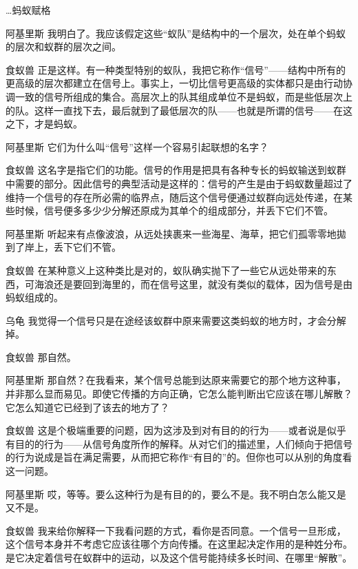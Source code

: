 \begin{dialog}{…蚂蚁赋格}
\begin{dialogue}
\item[阿基里斯]我明白了。我应该假定这些“蚁队”是结构中的一个层次，处在单个蚂蚁的层次和蚁群的层次之间。

\item[食蚁兽]正是这样。有一种类型特别的蚁队，我把它称作“信号”——结构中所有的更高级的层次都建立在信号上。事实上，一切比信号更高级的实体都只是由行动协调一致的信号所组成的集合。高层次上的队其组成单位不是蚂蚁，而是些低层次上的队。这样一直找下去，最后就到了最低层次的队——也就是所谓的信号——在这之下，才是蚂蚁。

\item[阿基里斯]它们为什么叫“信号”这样一个容易引起联想的名字？

\item[食蚁兽]这名字是指它们的功能。信号的作用是把具有各种专长的蚂蚁输送到蚁群中需要的部分。因此信号的典型活动是这样的：信号的产生是由于蚂蚁数量超过了维持一个信号的存在所必需的临界点，随后这个信号便通过蚁群向远处传递，在某些时候，信号便多多少少分解还原成为其单个的组成部分，并丢下它们不管。

\item[阿基里斯]听起来有点像波浪，从远处挟裹来一些海星、海草，把它们孤零零地拋到了岸上，丢下它们不管。

\item[食蚁兽]在某种意义上这种类比是对的，蚁队确实抛下了一些它从远处带来的东西，可海浪还是要回到海里的，而在信号这里，就没有类似的载体，因为信号是由蚂蚁组成的。

\item[乌龟]我觉得一个信号只是在途经该蚁群中原来需要这类蚂蚁的地方时，才会分解掉。

\item[食蚁兽]那自然。

\item[阿基里斯]那自然？在我看来，某个信号总能到达原来需要它的那个地方这种事，并非那么显而易见。即使它传播的方向正确，它怎么能判断出它应该在哪儿解散？它怎么知道它已经到了该去的地方了？

\item[食蚁兽]这是个极端重要的问题，因为这涉及到对有目的的行为——或者说是似乎有目的的行为——从信号角度所作的解释。从对它们的描述里，人们倾向于把信号的行为说成是旨在满足需要，从而把它称作“有目的”的。但你也可以从别的角度看这一问题。

\item[阿基里斯]哎，等等。要么这种行为是有目的的，要么不是。我不明白怎么能又是又不是。

\item[食蚁兽]我来给你解释一下我看问题的方式，看你是否同意。一个信号一旦形成，这个信号本身并不考虑它应该往哪个方向传播。在这里起决定作用的是种姓分布。是它决定着信号在蚁群中的运动，以及这个信号能持续多长时间、在哪里“解散”。


\end{dialogue}
\end{dialog}
